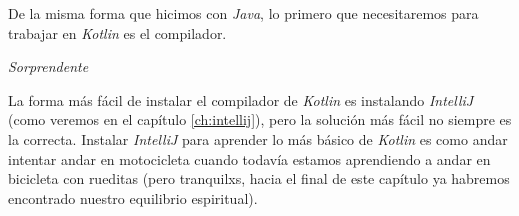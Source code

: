 De la misma forma que hicimos con \textit{Java}, lo primero que necesitaremos para trabajar en
\textit{Kotlin} es el compilador.
\begin{center}
  \textit{Sorprendente}
\end{center}

La forma más fácil de instalar el compilador de \textit{Kotlin} es instalando 
\textit{IntelliJ} (como veremos en el capítulo \ref{ch:intellij}), pero la 
solución más fácil no siempre es la correcta.
Instalar \textit{IntelliJ} para aprender lo más básico de \textit{Kotlin} es como andar intentar
andar en motocicleta cuando todavía estamos aprendiendo a andar en bicicleta con rueditas (pero 
tranquilxs, hacia el final de este capítulo ya habremos encontrado nuestro equilibrio espiritual).
